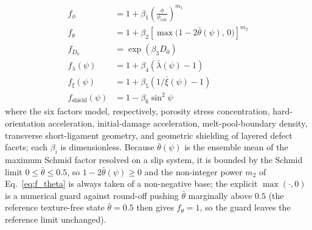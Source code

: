 \documentclass[twocolumn]{sagej}
\begin{document}
\begin{align}
f_\phi &= 1 + \beta_1 \left(\frac{\phi}{\phi_{\text{crit}}}\right)^{m_1} \label{eq:f_phi} \\
f_\theta &= 1 + \beta_2 \left[\max\!\big(1 - 2\bar{\theta}(\psi),\,0\big)\right]^{m_2} \label{eq:f_theta} \\
f_{D_0} &= \exp(\beta_3 D_0) \label{eq:f_D0} \\
f_\lambda(\psi) &= 1 + \beta_4 \left(\bar{\lambda}(\psi) - 1\right) \label{eq:f_lambda} \\
f_\xi(\psi) &= 1 + \beta_5 \left(1/\bar{\xi}(\psi) - 1\right) \label{eq:f_xi} \\
f_{\text{shield}}(\psi) &= 1 - \beta_6 \sin^2\psi \label{eq:f_shield}
\end{align}
where the six factors model, respectively, porosity stress concentration, hard-orientation acceleration, initial-damage acceleration, melt-pool-boundary density, transverse short-ligament geometry, and geometric shielding of layered defect facets; each $\beta_i$ is dimensionless. Because $\bar{\theta}(\psi)$ is the ensemble mean of the maximum Schmid factor resolved on a slip system, it is bounded by the Schmid limit $0 \le \bar{\theta} \le 0.5$, so $1 - 2\bar{\theta}(\psi) \ge 0$ and the non-integer power $m_2$ of Eq.~\eqref{eq:f_theta} is always taken of a non-negative base; the explicit $\max(\cdot,0)$ is a numerical guard against round-off pushing $\bar{\theta}$ marginally above $0.5$ (the reference texture-free state $\bar{\theta} = 0.5$ then gives $f_\theta = 1$, so the guard leaves the reference limit unchanged).
\end{document}

